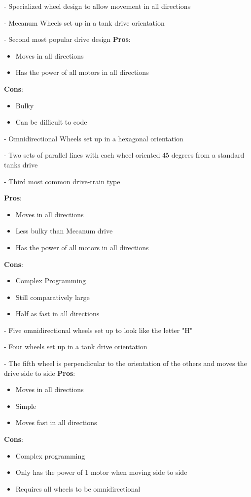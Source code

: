 
- Specialized wheel design to allow movement in all directions

- Mecanum Wheels set up in a tank drive orientation 

- Second most popular drive design 
\noindent
\textbf{Pros}:
\begin{itemize}
    \item Moves in all directions
    \item Has the power of all motors in all directions
\end{itemize}
\textbf{Cons}:
\begin{itemize}

    \item Bulky
    \item Can be difficult to code
\end{itemize}


- Omnidirectional Wheels set up in a hexagonal orientation

- Two sets of parallel lines with each wheel oriented 45 degrees from a standard tanks drive 

- Third most common drive-train type 

\noindent
\textbf{Pros}:
\begin{itemize}
    \item Moves in all directions
    \item Less bulky than Mecanum drive 
    \item Has the power of all motors in all directions
\end{itemize}
\textbf{Cons}:
\begin{itemize}
    \item Complex Programming 
    \item Still comparatively large 
    \item Half as fast in all directions
\end{itemize}


- Five omnidirectional wheels set up to look like the letter "H"

- Four wheels set up in a tank drive orientation 

- The fifth wheel is perpendicular to the orientation of the others and moves the drive side to side
\noindent
\textbf{Pros}:
\begin{itemize}
    \item Moves in all directions
    \item Simple
    \item Moves fast in all directions
\end{itemize}
\textbf{Cons}:
\begin{itemize}
    \item Complex programming
    \item Only has the power of 1 motor when moving side to side 
    \item Requires all wheels to be omnidirectional
\end{itemize}

